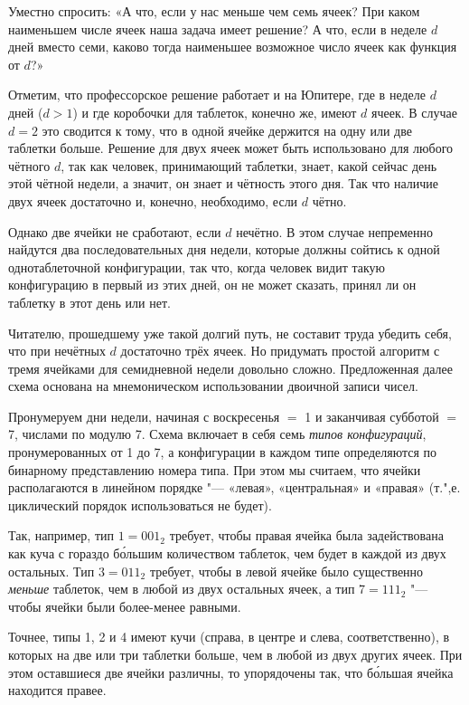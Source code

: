 \documentclass[twoside]{book}
\begin{document}
Уместно спросить:
«А что, если у нас меньше чем семь ячеек?
При каком наименьшем числе ячеек наша задача имеет решение?
А что, если в неделе $d$ дней вместо семи,
каково тогда наименьшее возможное число ячеек как функция от $d$?»

Отметим, что профессорское решение работает и на Юпитере, где в неделе $d$ дней ($d>1$) и где коробочки для таблеток, конечно же, имеют $d$ ячеек.
В случае $d=2$ это сводится к тому, что в одной ячейке держится на одну или две таблетки больше.
Решение для двух ячеек может быть использовано для любого чётного $d$, так как человек, принимающий таблетки, знает, какой сейчас день этой чётной недели, а значит, он знает и чётность этого дня.
Так что наличие двух ячеек достаточно и, конечно, необходимо, если $d$ чётно.

Однако две ячейки не сработают, если $d$ нечётно.
В этом случае непременно найдутся два последовательных дня недели, которые должны сойтись к одной однотаблеточной конфигурации, так что, когда человек видит такую конфигурацию в первый из этих дней, он не может сказать, принял ли он таблетку в этот день или нет.

Читателю, прошедшему уже такой долгий путь, не составит труда убедить себя, что при нечётных $d$ достаточно трёх ячеек.
Но придумать простой алгоритм с тремя ячейками для семидневной недели довольно сложно.
Предложенная далее схема основана на мнемоническом использовании двоичной записи чисел.

Пронумеруем дни недели, начиная с воскресенья $=$ 1 и заканчивая субботой $=$ 7, числами по модулю 7.
Схема включает в себя семь \emph{типов конфигураций}, пронумерованных от 1 до 7, а конфигурации в каждом типе определяются по бинарному представлению номера типа.
При этом мы считаем, что ячейки располагаются в линейном порядке "--- «левая», «центральная» и «правая» (т.",е. циклический порядок использоваться не будет).

Так, например, тип $1=001_2$ требует, чтобы правая ячейка была задействована как куча с гораздо б\'{о}льшим количеством таблеток, чем будет в каждой из двух остальных.
Тип $3 = 011_2$ требует, чтобы в левой ячейке было существенно \emph{меньше} таблеток, чем в любой из двух остальных ячеек,
а тип 7$ = 111_2$ "--- чтобы ячейки были более-менее равными.

Точнее, типы 1, 2 и 4 имеют кучи (справа, в центре и слева, соответственно), в которых на две или три таблетки больше, чем в любой из двух других ячеек.
При этом  оставшиеся две ячейки различны, то  упорядочены так, что б\'{о}льшая ячейка находится правее.
\end{document}
